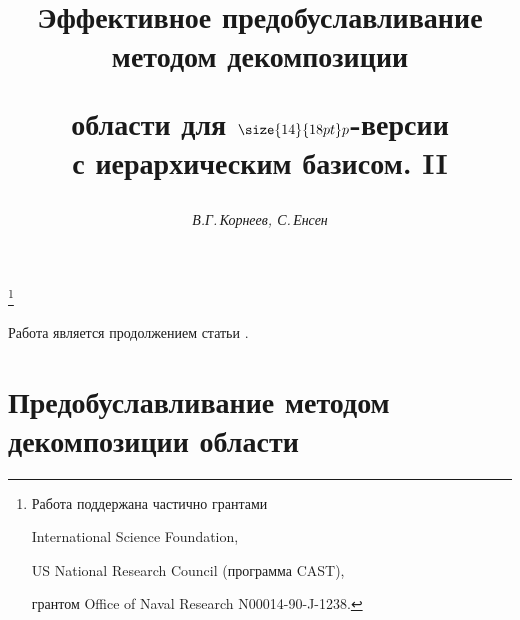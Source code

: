

 


\setcounter{page}{24}















\author{\it В.Г.\,Корнеев, С.\,Енсен}




\title{Эффективное предобуславливание методом декомпозиции 


области для $\size{14}{18pt}\selectfont p$-версии\\


с иерархическим базисом. II}


\thanks{Работа поддержана частично грантами


International Science Foundation,


US National Research Council (программа CAST),


грантом Office of Naval Research N00014-90-J-1238.}





\date{}




\pagestyle{plain} %







\maketitle


\label{begin}





Работа является продолжением статьи \cite{KornEn_I}.





\section{Предобуславливание методом декомпозиции области}





